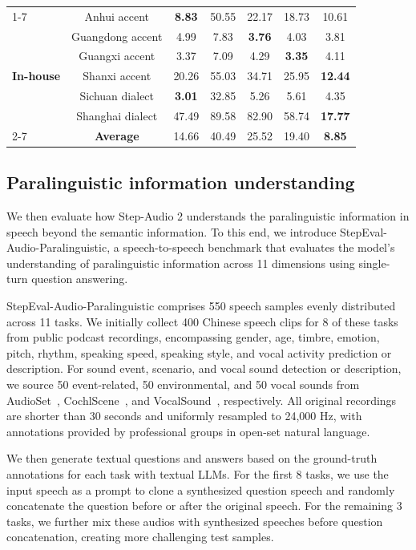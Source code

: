 \begin{table}[htb]
\begin{tabular}{lcccccc}
\cmidrule(r){1-7}
 & Anhui accent & \textbf{8.83} & 50.55 & 22.17 & 18.73 & 10.61 \\
 & Guangdong accent & 4.99 & 7.83 & \textbf{3.76} & 4.03 & 3.81 \\
 & Guangxi accent & 3.37 & 7.09 & 4.29 & \textbf{3.35} & 4.11 \\
\textbf{In-house} & Shanxi accent & 20.26 & 55.03 & 34.71 & 25.95 & \textbf{12.44} \\
 & Sichuan dialect & \textbf{3.01} & 32.85 & 5.26 & 5.61 & 4.35 \\
& Shanghai dialect & 47.49 & 89.58 & 82.90 & 58.74 & \textbf{17.77} \\
\cmidrule(lr){2-7}
& \textbf{Average} & 14.66 & 40.49 & 25.52 & 19.40 & \textbf{8.85} \\
\bottomrule
\end{tabular}
\end{table}


\subsection{Paralinguistic information understanding}

We then evaluate how Step-Audio 2 understands the paralinguistic information in speech beyond the semantic information.
To this end, we introduce StepEval-Audio-Paralinguistic, a speech-to-speech benchmark that evaluates the model's understanding of paralinguistic information across 11 dimensions using single-turn question answering.

StepEval-Audio-Paralinguistic comprises 550 speech samples evenly distributed across 11 tasks. We initially collect 400 Chinese speech clips for 8 of these tasks from public podcast recordings, encompassing gender, age, timbre, emotion, pitch, rhythm, speaking speed, speaking style, and vocal activity prediction or description. For sound event, scenario, and vocal sound detection or description, we source 50 event-related, 50 environmental, and 50 vocal sounds from AudioSet~\cite{7952261}, CochlScene~\cite{9979822}, and VocalSound~\cite{9746828}, respectively. All original recordings are shorter than 30 seconds and uniformly resampled to 24,000 Hz, with annotations provided by professional groups in open-set natural language.

We then generate textual questions and answers based on the ground-truth annotations for each task with textual LLMs. For the first 8 tasks, we use the input speech as a prompt to clone a synthesized question speech and randomly concatenate the question before or after the original speech. For the remaining 3 tasks, we further mix these audios with synthesized speeches before question concatenation, creating more challenging test samples.

